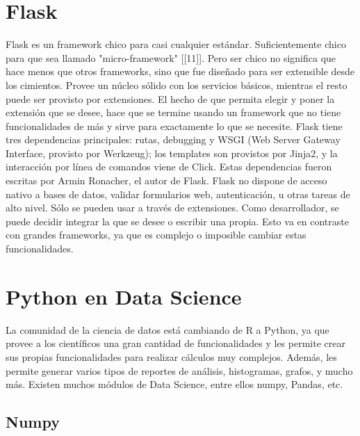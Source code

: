 \section[Flask]{Flask}

Flask es un framework chico para casi cualquier estándar. Suficientemente chico para que sea llamado "micro-framework" [[11]]. Pero ser chico no significa que hace menos que otros frameworks, sino que fue diseñado para ser extensible desde los cimientos. Provee un núcleo sólido con los servicios básicos, mientras el resto puede ser provisto por extensiones. El hecho de que permita elegir y poner la extensión que se desee, hace que se termine usando un framework que no tiene funcionalidades de más y sirve para exactamente lo que se necesite.
Flask tiene tres dependencias principales: rutas, debugging y WSGI (Web Server Gateway Interface, provisto por Werkzeug); los templates son provistos por Jinja2, y la interacción por línea de comandos viene de Click. Estas dependencias fueron escritas por Armin Ronacher, el autor de Flask.
Flask no dispone de acceso nativo a bases de datos, validar formularios web, autenticación, u otras tareas de alto nivel. Sólo se pueden usar a través de extensiones. Como desarrollador, se puede decidir integrar la que se desee o escribir una propia. Esto va en contraste con grandes frameworks, ya que es complejo o imposible cambiar estas funcionalidades.

\section[Python en Data Science]{Python en Data Science}

La comunidad de la ciencia de datos está cambiando de R a Python, ya que provee a los científicos una gran cantidad de funcionalidades y les permite crear sus propias funcionalidades para realizar cálculos muy complejos. Además, les permite generar varios tipos de reportes de análisis, histogramas, grafos, y mucho más.
Existen muchos módulos de Data Science, entre ellos numpy, Pandas, etc.

\subsection[Numpy]{Numpy}

